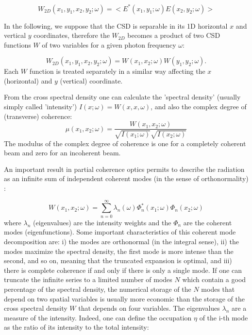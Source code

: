 \documentclass{iucr}              %
\begin{document}
\begin{equation}
W_{2D}(x_1,y_1,x_2,y_2;\omega) = <E^*(x_1,y_1;\omega) E(x_2,y_2;\omega)>
\label{eq:CSD_1D}
\end{equation}

In the following, we suppose that the CSD is separable in its 1D horizontal $x$ and vertical $y$ coordinates, therefore the $W_{2D}$ becomes a product of two CSD functions $W$ of two variables for a given photon frequency $\omega$:

\begin{equation}
W_{2D}(x_1,y_1,x_2,y_2;\omega) = W(x_1,x_2;\omega) W(y_1,y_2;\omega).
\label{eq:CSD_2D}
\end{equation}
Each $W$ function is treated separately in a similar way affecting the $x$ (horizontal) and $y$ (vertical) coordinate.

From the cross spectral density one can calculate the 'spectral density' (usually simply called 'intensity') $I(x;\omega)=W(x,x,\omega)$, and also the complex degree of (transverse) coherence: 
\begin{equation}
\mu(x_1,x_2;\omega) = \frac{W(x_1,x_2;\omega)}{\sqrt{I(x_1;\omega)}\sqrt{I(x_2;\omega)}}
\label{eq:DTC}
\end{equation}
The modulus of the complex degree of coherence is one for a completely coherent beam and zero for an incoherent beam. 

An important result in partial coherence optics permits to describe the radiation as an infinite sum of independent coherent modes (in the sense of orthonormality) :

\begin{equation}
W(x_1,x_2;\omega) = \sum_{n=0}^{\infty} \lambda_n(\omega) \Phi_n^*(x_1;\omega) \Phi_n(x_2;\omega) 
\label{eq:CMD}
\end{equation}
where $\lambda_n$ (eigenvalues) are the intensity weights and the $\Phi_n$ are the coherent modes (eigenfunctions). 
Some important characteristics of this coherent mode decomposition are: i) the modes are orthonormal (in the integral sense), ii) the modes maximize the spectral density, the first mode is more intense than the second, and so on, meaning that the truncated expansion is optimal, and iii) there is complete coherence if and only if there is only a single mode. If one can truncate the infinite series to a limited number of modes $N$ which contain a good percentage of the spectral density, the numerical storage of the $N$ modes that depend on two spatial variables is usually more economic than the storage of the cross spectral density $W$ that depends on four variables. 
The eigenvalues $\lambda_n$ are a measure of the intensity. Indeed, one can define the occupation $\eta$ of the i-th mode as the ratio of its intensity to the total intensity: 
\end{document}

